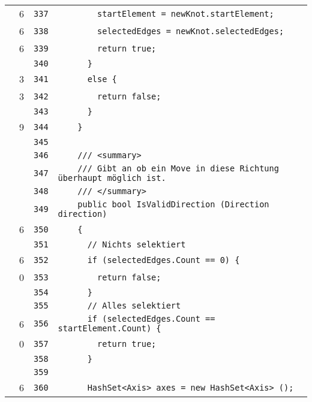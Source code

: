 \documentclass[a4paper,10pt]{article}
\begin{document}
\begin{longtable}[l]{lrrl}
\cellcolor{green} & 6 & \verb~337~ & \verb~        startElement = newKnot.startElement;~\\
\cellcolor{green} & 6 & \verb~338~ & \verb~        selectedEdges = newKnot.selectedEdges;~\\
\cellcolor{green} & 6 & \verb~339~ & \verb~        return true;~\\
\cellcolor{gray} &  & \verb~340~ & \verb~      }~\\
\cellcolor{green} & 3 & \verb~341~ & \verb~      else {~\\
\cellcolor{green} & 3 & \verb~342~ & \verb~        return false;~\\
\cellcolor{gray} &  & \verb~343~ & \verb~      }~\\
\cellcolor{green} & 9 & \verb~344~ & \verb~    }~\\
\cellcolor{gray} &  & \verb~345~ & \verb~~\\
\cellcolor{gray} &  & \verb~346~ & \verb~    /// <summary>~\\
\cellcolor{gray} &  & \verb~347~ & \verb~    /// Gibt an ob ein Move in diese Richtung überhaupt möglich ist.~\\
\cellcolor{gray} &  & \verb~348~ & \verb~    /// </summary>~\\
\cellcolor{gray} &  & \verb~349~ & \verb~    public bool IsValidDirection (Direction direction)~\\
\cellcolor{green} & 6 & \verb~350~ & \verb~    {~\\
\cellcolor{gray} &  & \verb~351~ & \verb~      // Nichts selektiert~\\
\cellcolor{green} & 6 & \verb~352~ & \verb~      if (selectedEdges.Count == 0) {~\\
\cellcolor{red} & 0 & \verb~353~ & \verb~        return false;~\\
\cellcolor{gray} &  & \verb~354~ & \verb~      }~\\
\cellcolor{gray} &  & \verb~355~ & \verb~      // Alles selektiert~\\
\cellcolor{green} & 6 & \verb~356~ & \verb~      if (selectedEdges.Count == startElement.Count) {~\\
\cellcolor{red} & 0 & \verb~357~ & \verb~        return true;~\\
\cellcolor{gray} &  & \verb~358~ & \verb~      }~\\
\cellcolor{gray} &  & \verb~359~ & \verb~~\\
\cellcolor{green} & 6 & \verb~360~ & \verb~      HashSet<Axis> axes = new HashSet<Axis> ();~\\

\end{longtable}
\end{document}
